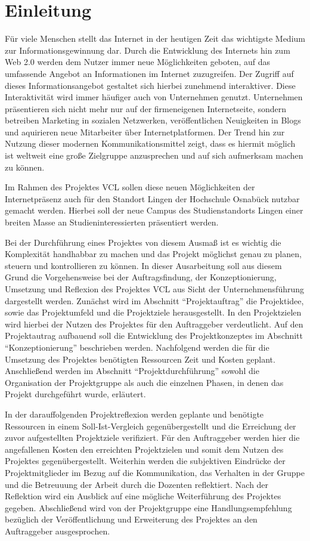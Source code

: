 \section{Einleitung}
\label{sec:Einleitung}
Für viele Menschen stellt das Internet in der heutigen Zeit das wichtigste
Medium zur Informationsgewinnung dar. Durch die Entwicklung des Internets hin
zum Web 2.0 werden dem Nutzer immer neue Möglichkeiten geboten, auf das
umfassende Angebot an Informationen im Internet zuzugreifen. Der Zugriff auf
dieses Informationsangebot gestaltet sich hierbei zunehmend interaktiver.
Diese Interaktivität wird immer häufiger auch von Unternehmen genutzt.
Unternehmen präsentieren sich nicht mehr nur auf der firmeneigenen
Internetseite, sondern betreiben Marketing in sozialen Netzwerken,
veröffentlichen Neuigkeiten in Blogs und aquirieren neue Mitarbeiter über
Internetplatformen. Der Trend hin zur Nutzung dieser modernen
Kommunikationsmittel zeigt, dass es hiermit möglich ist weltweit eine große
Zielgruppe anzusprechen und auf sich aufmerksam machen zu können.

Im Rahmen des Projektes \ac{VCL} sollen diese neuen
Möglichkeiten der Internetpräsenz auch für den Standort Lingen der Hochschule
Osnabück nutzbar gemacht werden. Hierbei soll der neue Campus des
Studienstandorts Lingen einer breiten Masse an Studieninteressierten
präsentiert werden.

Bei der Durchführung eines Projektes von diesem Ausmaß ist es wichtig die
Komplexität handhabbar zu machen und das Projekt möglichst genau zu planen,
steuern und kontrollieren zu können. In dieser Ausarbeitung soll aus diesem
Grund die Vorgehensweise bei der Auftragsfindung, der Konzeptionierung,
Umsetzung und Reflexion des Projektes \acs{VCL} aus Sicht der
Unternehmensführung dargestellt werden. Zunächst wird im Abschnitt
"`Projektauftrag"' die Projektidee, sowie das Projektumfeld und die Projektziele
herausgestellt. In den Projektzielen wird hierbei der Nutzen des Projektes
für den Auftraggeber verdeutlicht. Auf den Projektautrag aufbauend soll
die Entwicklung des Projektkonzeptes im Abschnitt "`Konzeptionierung"'
beschrieben werden. Nachfolgend werden die für die Umsetzung des Projektes
benötigten Ressourcen Zeit und Kosten geplant. Anschließend werden im Abschnitt
"`Projektdurchführung"' sowohl die Organisation der Projektgruppe als auch die
einzelnen Phasen, in denen das Projekt durchgeführt wurde, erläutert.  

In der darauffolgenden Projektreflexion werden geplante und benötigte Ressourcen
in einem Soll-Ist-Vergleich gegenübergestellt und die Erreichung der zuvor
aufgestellten Projektziele verifiziert. Für den Auftraggeber werden hier die
angefallenen Kosten den erreichten Projektzielen und somit dem Nutzen des
Projektes gegenübergestellt. Weiterhin werden die subjektiven Eindrücke der
Projektmitglieder im Bezug auf die Kommunikation, das Verhalten in der Gruppe
und die Betreuuung der Arbeit durch die Dozenten reflektiert. Nach der
Reflektion wird ein Ausblick auf eine mögliche Weiterführung des Projektes
gegeben. Abschließend wird von der Projektgruppe eine Handlungsempfehlung
bezüglich der Veröffentlichung und Erweiterung des Projektes an den Auftraggeber
ausgesprochen.